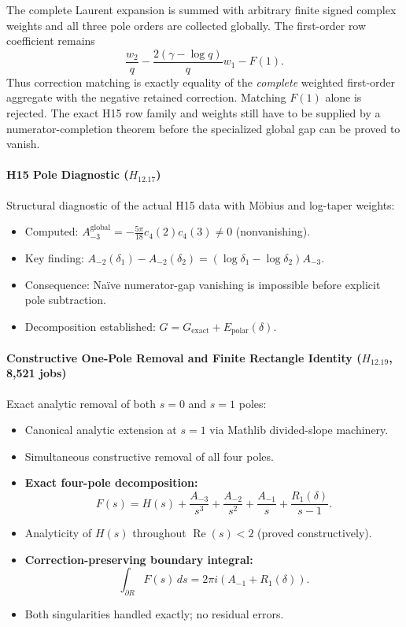 \documentclass[11pt,a4paper]{article}
\theoremstyle{plain}
\theoremstyle{definition}
\theoremstyle{remark}
\DeclareMathOperator{\RePart}{Re}
\renewcommand{\Re}{\RePart}
\begin{document}
The complete Laurent expansion is summed with arbitrary finite signed complex
weights and all three pole orders are collected globally.  The first-order
row coefficient remains
\[
  \frac{w_2}{q}-\frac{2(\gamma-\log q)}{q}w_1-F(1).
\]
Thus correction matching is exactly equality of the \emph{complete} weighted
first-order aggregate with the negative retained correction.  Matching
$F(1)$ alone is rejected.  The exact H15 row family and weights still have to
be supplied by a numerator-completion theorem before the specialized global
gap can be proved to vanish.

\paragraph{H15 Pole Diagnostic ($H_{12.17}$)}

Structural diagnostic of the actual H15 data with Möbius and log-taper weights:
\begin{itemize}[leftmargin=2em]
  \item Computed: $A_{-3}^{\text{global}} = -\frac{5\pi}{18} c_4(2)c_4(3) \ne 0$ (nonvanishing).
  \item Key finding: $A_{-2}(\delta_1) - A_{-2}(\delta_2) = (\log \delta_1 - \log \delta_2) A_{-3}$.
  \item Consequence: Naïve numerator-gap vanishing is impossible before explicit pole subtraction.
  \item Decomposition established: $G = G_{\text{exact}} + E_{\text{polar}}(\delta)$.
\end{itemize}

\paragraph{Constructive One-Pole Removal and Finite Rectangle Identity ($H_{12.19}$, 8,521 jobs)}

Exact analytic removal of both $s=0$ and $s=1$ poles:
\begin{itemize}[leftmargin=2em]
  \item Canonical analytic extension at $s=1$ via Mathlib divided-slope machinery.
  \item Simultaneous constructive removal of all four poles.
  \item \textbf{Exact four-pole decomposition:}
  \[
    F(s) = H(s) + \frac{A_{-3}}{s^3} + \frac{A_{-2}}{s^2} + \frac{A_{-1}}{s} + \frac{R_1(\delta)}{s-1}.
  \]
  \item Analyticity of $H(s)$ throughout $\Re(s) < 2$ (proved constructively).
  \item \textbf{Correction-preserving boundary integral:}
  \[
    \int_{\partial R} F(s)\,ds = 2\pi i(A_{-1} + R_1(\delta)).
  \]
  \item Both singularities handled exactly; no residual errors.
\end{itemize}
\end{document}
